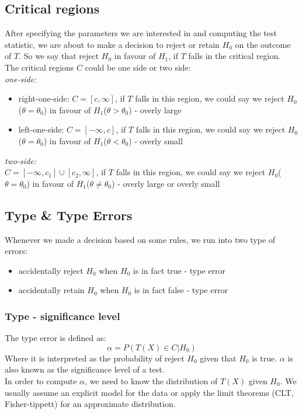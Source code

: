 \documentclass[12pt ]{article}
\newcommand{\RomanNumeralCaps}[1] {\MakeUppercase{\romannumeral #1}}
\begin{document}
\subsection{Critical regions}
After specifying the parameters we are interested in and computing the test statistic, we are about to make a decision to reject or retain $H_{0}$ on the outcome of $T$. So we say that reject $H_{0}$ in favour of $H_{1}$, if $T$ falls in the critical region.\\
The critical regions $C$ could be one side or two side:\\
\textit{one-side:}
\begin{itemize}
\item right-one-side: $C = [c, \infty]$, if $T$ falls in this region, we could say we reject $H_{0}$($\theta = \theta_{0}$) in favour of $H_{1}$($\theta > \theta_{0}$) - overly large
\item left-one-side: $C = [-\infty, c]$, if $T$ falls in this region, we could say we reject $H_{0}$($\theta = \theta_{0}$) in favour of $H_{1}$($\theta < \theta_{0}$) - overly small
\end{itemize}
\noindent
\textit{two-side:} \\
$C = [-\infty, c_{1}] \cup [c_{2}, \infty]$, if $T$ falls in this region, we could say we reject $H_{0}$($\theta = \theta_{0}$) in favour of $H_{1}$($\theta \neq \theta_{0}$) - overly large or overly small

\subsection{Type \RomanNumeralCaps{1} \& Type \RomanNumeralCaps{2} Errors}
Whenever we made a decision based on some rules, we run into two type of errors:
\begin{itemize}
\item accidentally reject $H_{0}$ when $H_{0}$ is in fact true - type \RomanNumeralCaps{1} error
\item accidentally retain $H_{0}$ when $H_{0}$ is in fact false - type \RomanNumeralCaps{2} error
\end{itemize}

\subsubsection{Type \RomanNumeralCaps{1} - significance level}
The type \RomanNumeralCaps{1} error is defined as:
\begin{equation*}
\alpha = P(T(X) \in C | H_{0})
\end{equation*}
Where it is interpreted as the probability of reject $H_{0}$ given that $H_{0}$ is true. $\alpha$ is also known as the significance level of a test. \\ 
In order to compute $\alpha$, we need to know the distribution of $T(X)$ given $H_{0}$. We usually assume an explicit model for the data or apply the limit theorems (CLT, Fisher-tippett) for an approximate distribution. \\
\end{document}
